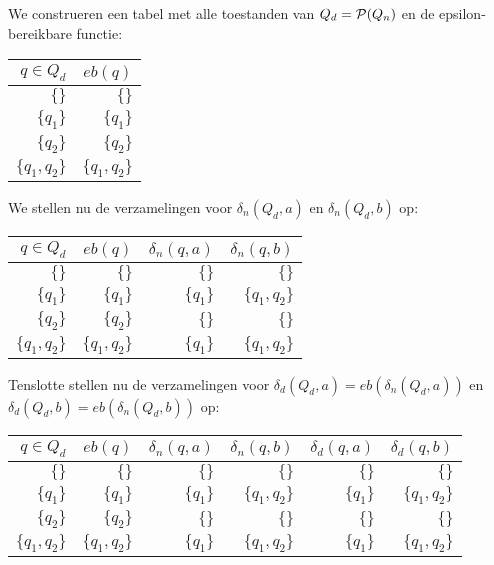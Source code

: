 We construeren een tabel met alle toestanden van $Q_d = \mathcal{P}(Q_n)$ en de epsilon-bereikbare functie:

\begin{center}
\begin{tabular}{r|r}
  $q \in Q_d$ & $eb(q)$ \\ \hline
  $\{\}$ & $\{\}$ \\
  $\{q_1\}$ & $\{q_1\}$ \\
  $\{q_2\}$ & $\{q_2\}$ \\
  $\{q_1,q_2\}$ & $\{q_1,q_2\}$ \\
\end{tabular}
\end{center}

We stellen nu de verzamelingen voor $\delta_n(Q_d,a)$ en $\delta_n(Q_d,b)$ op:

\begin{center}
\begin{tabular}{r|r|r|r}
  $q \in Q_d$ & $eb(q)$ & $\delta_n(q,a)$ & $\delta_n(q,b)$ \\ \hline
  $\{\}$ & $\{\}$ & $\{\}$ & $\{\}$ \\
  $\{q_1\}$ & $\{q_1\}$ & $\{q_1\}$ & $\{q_1,q_2\}$ \\
  $\{q_2\}$ & $\{q_2\}$ & $\{\}$ & $\{\}$ \\
  $\{q_1,q_2\}$ & $\{q_1,q_2\}$ & $\{q_1\}$ & $\{q_1,q_2\}$ \\
\end{tabular}
\end{center}

Tenslotte stellen nu de verzamelingen voor $\delta_d(Q_d,a)=eb(\delta_n(Q_d,a))$ en $\delta_d(Q_d,b)=eb(\delta_n(Q_d,b))$ op:

\begin{center}
\begin{tabular}{r|r|r|r|r|r}
  $q \in Q_d$ & $eb(q)$ & $\delta_n(q,a)$ & $\delta_n(q,b)$ & $\delta_d(q,a)$ & $\delta_d(q,b)$ \\ \hline
  $\{\}$ & $\{\}$ & $\{\}$ & $\{\}$ & $\{\}$ & $\{\}$ \\
  $\{q_1\}$ & $\{q_1\}$ & $\{q_1\}$ & $\{q_1,q_2\}$ & $\{q_1\}$ & $\{q_1,q_2\}$ \\
  $\{q_2\}$ & $\{q_2\}$ & $\{\}$ & $\{\}$ & $\{\}$ & $\{\}$ \\
  $\{q_1,q_2\}$ & $\{q_1,q_2\}$ & $\{q_1\}$ & $\{q_1,q_2\}$ & $\{q_1\}$ & $\{q_1,q_2\}$ \\
\end{tabular}
\end{center}

